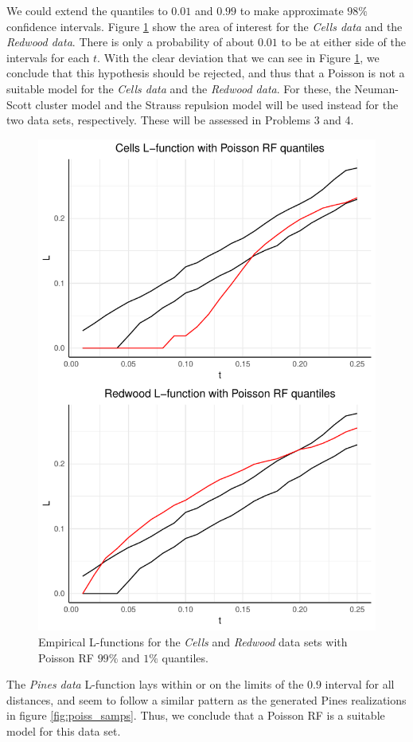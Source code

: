 We could extend the quantiles to $0.01$ and $0.99$ to make approximate $98\%$ confidence intervals. Figure \ref{fig:poiss_quantiles2} show the area of interest for the \textit{Cells data} and the \textit{Redwood data}. There is only a probability of about $0.01$ to be at either side of the intervals for each $t$. With the clear deviation that we can see in Figure \ref{fig:poiss_quantiles2}, we conclude that this hypothesis should be rejected, and thus that a Poisson is not a suitable model for the \textit{Cells data} and the \textit{Redwood data}. For these, the Neuman-Scott cluster model and the Strauss repulsion model will be used instead for the two data sets, respectively. These will be assessed in Problems 3 and 4. 

\begin{figure}
    \centering
    \includegraphics[scale=0.95]{figures/prob1_quantiles2.pdf}
    \caption{Empirical L-functions for the \textit{Cells} and \textit{Redwood} data sets with Poisson RF $99\%$ and $1\%$ quantiles.}
    \label{fig:poiss_quantiles2}
\end{figure}

The \textit{Pines data} L-function lays within or on the limits of the $0.9$ interval for all distances, and seem to follow a similar pattern as the generated Pines realizations in figure \ref{fig:poiss_samps}. Thus, we conclude that a Poisson RF is a suitable model for this data set.